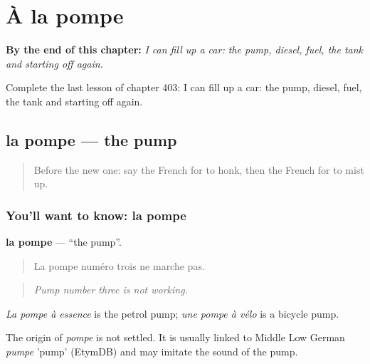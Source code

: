 
\chapter{À la pompe}
\label{ch:fr-a-la-pompe}

\begin{chapteropening}
\textbf{By the end of this chapter:} \emph{I can fill up a car: the pump, diesel, fuel, the tank and starting off again.}

Complete the last lesson of chapter 403: I can fill up a car: the pump, diesel, fuel, the tank and starting off again.
\end{chapteropening}

\section[la pompe]{la pompe — the pump}

\label{lesson:FR-C403-pompe}



\begin{quote}
Before the new one: say the French for to honk, then the French for to mist up.
\end{quote}

\subsection*{You'll want to know: la pompe}
\textbf{la pompe} — \textquotedblleft{}the pump\textquotedblright{}.

\begin{quote}
La pompe numéro trois ne marche pas.
\end{quote}

\begin{quote}
\emph{Pump number three is not working.}
\end{quote}

\emph{La pompe à essence} is the petrol pump; \emph{une pompe à vélo} is a bicycle pump.

\begin{cousinweb}
The origin of \emph{pompe} is not settled. It is usually linked to Middle Low German \emph{pumpe} 'pump' (EtymDB) and may imitate the sound of the pump.
\end{cousinweb}

